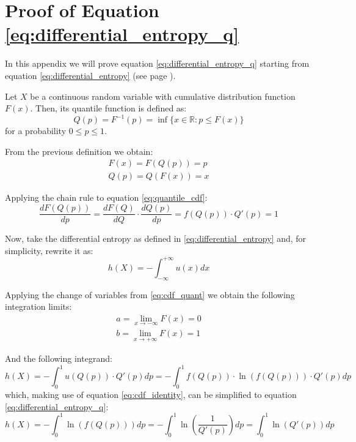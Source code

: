 \chapter{Proof of Equation \ref{eq:differential_entropy_q}}\label{entropy_proof}

In this appendix we will prove equation \ref{eq:differential_entropy_q} starting from equation \ref{eq:differential_entropy} (see page \pageref{eq:differential_entropy}).

Let $X$ be a continuous random variable with cumulative distribution function $F(x)$. Then, its quantile function is defined as:
\begin{equation}
Q(p) = F^{-1}(p) = \inf\{x \in \mathbb{R} : p \leq F(x)\}
\end{equation}
for a probability $0 \leq p \leq 1$.

From the previous definition we obtain:
\begin{align} 
F(x) = F(Q(p)) = p \label{eq:quantile_cdf} \\ 
Q(p) = Q(F(x)) = x \label{eq:cdf_quant}
\end{align}

Applying the chain rule to equation \ref{eq:quantile_cdf}:
\begin{equation}\label{eq:cdf_identity}
\frac{dF(Q(p))}{dp} = \frac{dF(Q)}{dQ} \cdot \frac{dQ(p)}{dp} = f(Q(p)) \cdot Q'(p) = 1
\end{equation}

Now, take the differential entropy as defined in \ref{eq:differential_entropy} and, for simplicity, rewrite it as:
\begin{equation}
h(X) = - \int_{-\infty}^{+\infty} u(x) dx
\end{equation}

Applying the change of variables from \ref{eq:cdf_quant} we obtain the following integration limits:
\begin{align}
a = \lim_{x \to -\infty} F(x) = 0\\
b = \lim_{x \to +\infty} F(x) = 1
\end{align}

And the following integrand:
\begin{equation}
h(X) = - \int_{0}^{1} u(Q(p)) \cdot Q'(p) dp = - \int_{0}^{1} f(Q(p)) \cdot \ln(f(Q(p))) \cdot Q'(p) dp
\end{equation}
which, making use of equation \ref{eq:cdf_identity}, can be simplified to equation \ref{eq:differential_entropy_q}:
\begin{equation}
h(X) = -  \int_{0}^{1} \ln\left(f(Q(p))\right) dp = - \int_{0}^{1} \ln\left(\frac{1}{Q'(p)}\right) dp = \int_{0}^{1} \ln\left(Q'(p)\right) dp
\end{equation}